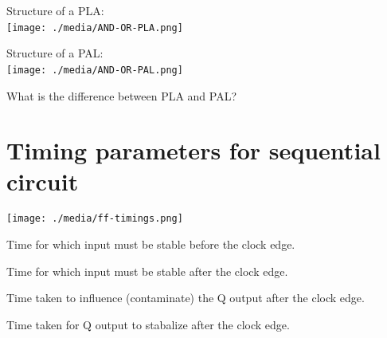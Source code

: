 \begin{definition} Structure of a PLA:\\
  \texttt{[image: ./media/AND-OR-PLA.png]}~\cite[Section~B.6.1]{stephen2022fundamentals}
\end{definition}

\begin{definition} Structure of a PAL:\\
  \texttt{[image: ./media/AND-OR-PAL.png]}~\cite[Section~B.6.2]{stephen2022fundamentals}
\end{definition}

\begin{example}
  What is the difference between PLA and PAL?
\end{example}
\vspace{5em}

\section{Timing parameters for sequential circuit~\cite[Section~3.5]{harris2022digital}}

\texttt{[image: ./media/ff-timings.png]}
\begin{definition}
  Time for which input must be stable before the clock edge.
\end{definition}

\begin{definition}
  Time for which input must be stable after the clock edge.
\end{definition}

\begin{definition}
  Time taken to influence (contaminate) the Q output after the clock edge.
\end{definition}

\begin{definition}
  Time taken for Q output to stabalize  after the clock edge.
\end{definition}

